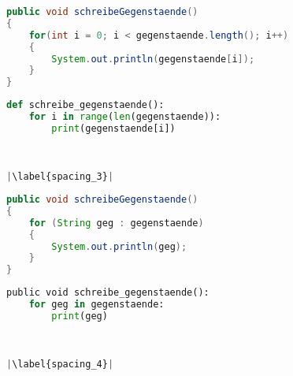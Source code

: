 \begin{minipage}{.5\linewidth}
\begin{lstlisting}[language=java,caption={for-Schleife Java},captionpos=b,label={lst:java:for},frame=none]
public void schreibeGegenstaende()
{
    for(int i = 0; i < gegenstaende.length(); i++)
    {
        System.out.println(gegenstaende[i]);
    }
}
\end{lstlisting}
\end{minipage}
\begin{minipage}{.5\linewidth}
\begin{lstlisting}[language=python,caption={for-Schleife Python},captionpos=b,label={lst:python:for},frame=l,escapechar=|]
def schreibe_gegenstaende():
    for i in range(len(gegenstaende)):
        print(gegenstaende[i])
        
        

|\label{spacing_3}|
\end{lstlisting}
\end{minipage}

\begin{minipage}{.5\linewidth}
\begin{lstlisting}[language=java,caption={foreach-Schleife Java},captionpos=b,label={lst:java:foreach},frame=none]
public void schreibeGegenstaende()
{
    for (String geg : gegenstaende)
    {
        System.out.println(geg);
    }
}
\end{lstlisting}
\end{minipage}
\begin{minipage}{.5\linewidth}
\begin{lstlisting}[language=python,caption={foreach-Schleife Python},captionpos=b,label={lst:python:foreach},frame=l,escapechar=|]
public void schreibe_gegenstaende():
    for geg in gegenstaende:
        print(geg)
        
        

|\label{spacing_4}|
\end{lstlisting}
\end{minipage}

